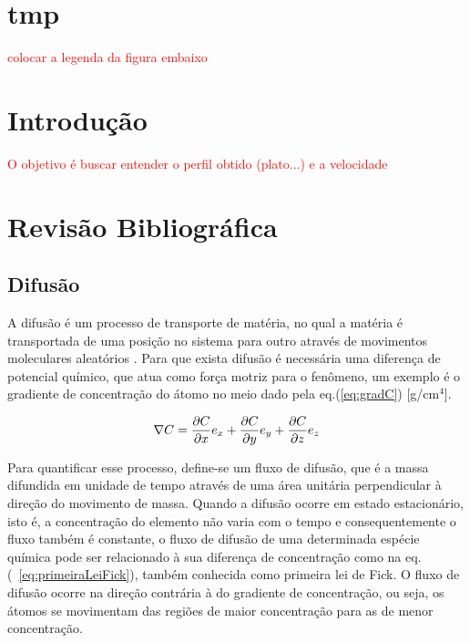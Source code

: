 \documentclass[]{politex}
\newcommand\myworries[1]{\textcolor{red}{#1}}
\begin{document}
\capa

\chapter{tmp}
\par \myworries{colocar a legenda da figura embaixo}
\listadefiguras
\listadetabelas

\sumario


\chapter{Introdução}

\myworries{O objetivo é buscar entender o perfil obtido (plato...) e a velocidade}

\chapter{Revisão Bibliográfica}
\section{Difusão}
\label{sec:difusao}
	A difusão é um processo de transporte de matéria, no qual a matéria é transportada de uma posição no sistema para outro através de movimentos moleculares aleatórios \cite{crank1979mathematics}. Para que exista difusão é necessária uma diferença de potencial químico, que atua como força motriz para o fenômeno, um exemplo é o gradiente de concentração do átomo no meio dado pela eq.(\ref{eq:gradC}) [g/cm$^4$]. 

\begin{equation} \label{eq:gradC}
\nabla C = \pdv{C}{x}e_x + \pdv{C}{y}e_y + \pdv{C}{z}e_z
\end{equation}

Para quantificar esse processo, define-se um fluxo de difusão, que é a massa difundida em unidade de tempo através de uma área unitária perpendicular à direção do movimento de massa. Quando a difusão ocorre em estado estacionário, isto é, a concentração do elemento não varia com o tempo e consequentemente o fluxo também é constante, o fluxo de difusão de uma determinada espécie química pode ser relacionado à sua diferença de concentração como na eq.(~\ref{eq:primeiraLeiFick}), também conhecida como primeira lei de Fick. O fluxo de difusão ocorre na direção contrária à do gradiente de concentração, ou seja, os átomos se movimentam das regiões de maior concentração para as de menor concentração.
\end{document}
